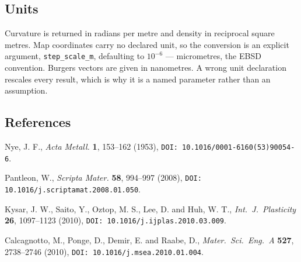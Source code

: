 \subsection{Units}

Curvature is returned in radians per metre and density in reciprocal square
metres. Map coordinates carry no declared unit, so the conversion is an explicit
argument, \texttt{step\_scale\_m}, defaulting to $10^{-6}$ --- micrometres, the
EBSD convention. Burgers vectors are given in nanometres. A wrong unit
declaration rescales every result, which is why it is a named parameter rather
than an assumption.

\subsection{References}

Nye, J. F., \emph{Acta Metall.} \textbf{1}, 153--162 (1953),
\texttt{DOI: 10.1016/0001-6160(53)90054-6}.

Pantleon, W., \emph{Scripta Mater.} \textbf{58}, 994--997 (2008),
\texttt{DOI: 10.1016/j.scriptamat.2008.01.050}.

Kysar, J. W., Saito, Y., Oztop, M. S., Lee, D. and Huh, W. T.,
\emph{Int.\ J.\ Plasticity} \textbf{26}, 1097--1123 (2010),
\texttt{DOI: 10.1016/j.ijplas.2010.03.009}.

Calcagnotto, M., Ponge, D., Demir, E. and Raabe, D.,
\emph{Mater.\ Sci.\ Eng.\ A} \textbf{527}, 2738--2746 (2010),
\texttt{DOI: 10.1016/j.msea.2010.01.004}.
